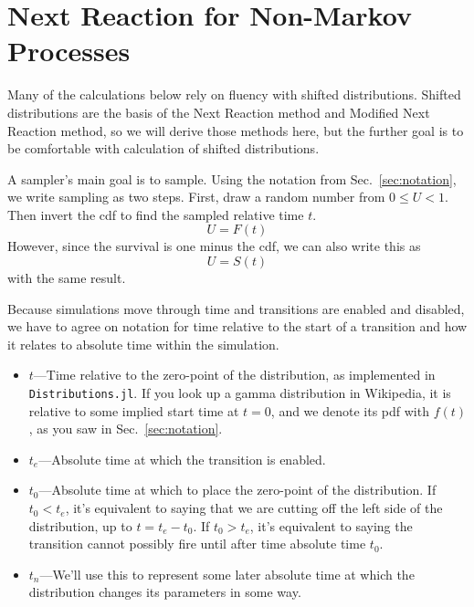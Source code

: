 \documentclass{article}
\begin{document}
\section{Next Reaction for Non-Markov Processes}\label{sec:nextreaction}

Many of the calculations below rely on fluency with shifted distributions. Shifted distributions are the basis of the Next Reaction method and Modified Next Reaction method, so we will derive those methods here, but the further goal is to be comfortable with calculation of shifted distributions.

A sampler's main goal is to sample. Using the notation from Sec.~\ref{sec:notation}, we write sampling as two steps. First, draw a random number from $0\le U<1$. Then invert the cdf to find the sampled relative time $t$.
\begin{equation}
	U = F(t)
\end{equation}
However, since the survival is one minus the cdf, we can also write this as
\begin{equation}
	U = S(t)\label{eqn:basesample}
\end{equation}
with the same result.

Because simulations move through time and transitions are enabled and disabled, we have to agree on notation for time relative to the start of a transition and how it relates to absolute time within the simulation.

\begin{itemize}
\item $t$---Time relative to the zero-point of the distribution, as implemented in \texttt{Distributions.jl}. If you look up a gamma distribution in Wikipedia, it is relative to some implied start time at $t=0$, and we denote its pdf with $f(t)$, as you saw in Sec.~\ref{sec:notation}.

\item $t_e$---Absolute time at which the transition is enabled.

\item $t_0$---Absolute time at which to place the zero-point of the distribution. If $t_0 < t_e$, it's equivalent to saying that we are cutting off the left side of the distribution, up to $t=t_e-t_0$. If $t_0>t_e$, it's equivalent to saying the transition cannot possibly fire until after time absolute time $t_0$.

\item $t_n$---We'll use this to represent some later absolute time at which the distribution changes its parameters in some way.
\end{itemize}
\end{document}
